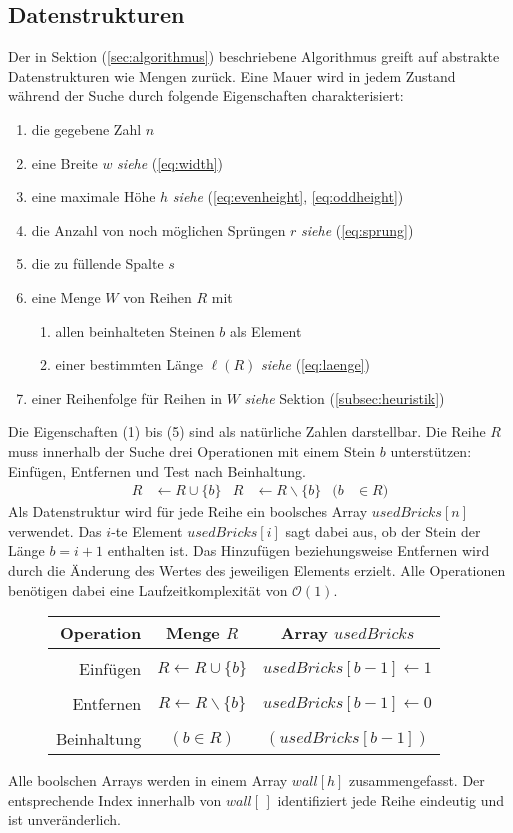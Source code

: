 \documentclass[a4paper, 12pt]{scrartcl}
\newcommand{\see}[1]{\hfill\emph{siehe} (\ref{#1})}
\begin{document}
\subsection{Datenstrukturen}
Der in Sektion (\ref{sec:algorithmus}) beschriebene Algorithmus greift auf abstrakte Datenstrukturen wie Mengen zurück. Eine Mauer wird in jedem Zustand während der Suche durch folgende Eigenschaften charakterisiert:
\begin{enumerate}
	\itemsep-2pt
	\item die gegebene Zahl $n$
	\item eine Breite $w$ \see{eq:width}
	\item eine maximale Höhe $h$ \hfill \emph{siehe} (\ref{eq:evenheight}, \ref{eq:oddheight})
	\item die Anzahl von noch möglichen Sprüngen $r$ \see{eq:sprung}
	\item die zu füllende Spalte $s$
	\item eine Menge $W$ von Reihen $R$ mit
	\begin{enumerate}
		\item allen beinhalteten Steinen $b$ als Element
		\item einer bestimmten Länge $\ell(R)$ \see{eq:laenge}
	\end{enumerate}
	\item einer Reihenfolge für Reihen in $W$  \emph{siehe} Sektion (\ref{subsec:heuristik})
\end{enumerate}
Die Eigenschaften (1) bis (5) sind als natürliche Zahlen darstellbar. Die Reihe $R$ muss innerhalb der Suche drei Operationen mit einem Stein $b$ unterstützen: Einfügen, Entfernen und Test nach Beinhaltung.
\begin{align*}
 	R &\leftarrow R\cup\{b\} & R &\leftarrow R\backslash\{b\} & (b &\in R)
\end{align*}
Als Datenstruktur wird für jede Reihe ein boolsches Array $usedBricks[n]$ verwendet. Das $i$-te Element $usedBricks[i]$ sagt dabei aus, ob der Stein der Länge $b=i+1$ enthalten ist. Das Hinzufügen beziehungsweise Entfernen wird durch die Änderung des Wertes des jeweiligen Elements erzielt. Alle Operationen benötigen dabei eine Laufzeitkomplexität von $\mathcal{O}(1)$.
\begin{figure}[H]
	\centering
	\begin{tabular}{rcc}
		Operation & \hspace{1cm} Menge $R$ \hspace{1cm} & Array $usedBricks$ \\
		\hline\\
		Einfügen & $R \leftarrow R\cup\{b\}$ & $usedBricks[b-1] \leftarrow 1$ \\\\
		Entfernen & $R \leftarrow R\backslash\{b\}$ & $usedBricks[b-1] \leftarrow 0$ \\\\
		Beinhaltung & $(b \in R)$ & $(usedBricks[b-1])$
	\end{tabular}
\end{figure}
Alle boolschen Arrays werden in einem Array $wall[h]$ zusammengefasst. Der entsprechende Index innerhalb von $wall[\,]$ identifiziert jede Reihe eindeutig und ist unveränderlich.
\end{document}
